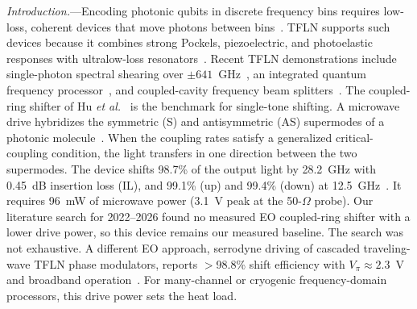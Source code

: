 \documentclass[aps,prl,reprint,superscriptaddress,amsmath,amssymb,floatfix]{revtex4-2}
\begin{document}
\emph{Introduction.}---Encoding photonic qubits in discrete frequency bins requires low-loss, coherent devices that move photons between bins~\cite{Lukens2017,Kues2017,Lu2018}. TFLN supports such devices because it combines strong Pockels, piezoelectric, and photoelastic responses with ultralow-loss resonators~\cite{Wang2018,Zhang2017,Zhu2026loss}. Recent TFLN demonstrations include single-photon spectral shearing over $\pm641$~GHz~\cite{Zhu2022}, an integrated quantum frequency processor~\cite{Yang2026}, and coupled-cavity frequency beam splitters~\cite{Cohen2026}. The coupled-ring shifter of Hu \emph{et al.}~\cite{Hu2021} is the benchmark for single-tone shifting. A microwave drive hybridizes the symmetric (S) and antisymmetric (AS) supermodes of a photonic molecule~\cite{Zhang2019}. When the coupling rates satisfy a generalized critical-coupling condition, the light transfers in one direction between the two supermodes. The device shifts 98.7\% of the output light by 28.2~GHz with 0.45~dB insertion loss (IL), and 99.1\% (up) and 99.4\% (down) at 12.5~GHz~\cite{Hu2021}. It requires 96~mW of microwave power (3.1~V peak at the 50-$\Omega$ probe). Our literature search for 2022--2026 found no measured EO coupled-ring shifter with a lower drive power, so this device remains our measured baseline. The search was not exhaustive. A different EO approach, serrodyne driving of cascaded traveling-wave TFLN phase modulators, reports $>$98.8\% shift efficiency with $V_\pi\approx2.3$~V and broadband operation~\cite{Qiu2025}.%
 For many-channel or cryogenic frequency-domain processors, this drive power sets the heat load.
\end{document}
